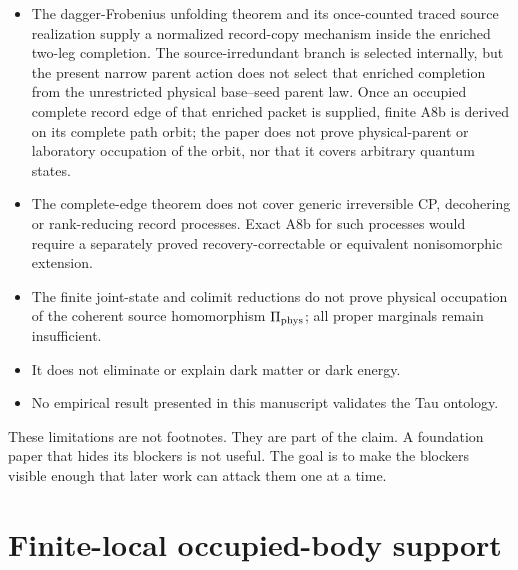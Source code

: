 \documentclass[11pt]{article}
\begin{document}
\begin{itemize}[leftmargin=*,itemsep=1pt,topsep=3pt]
  The support theorem and mixed-state realization prove that the common-Gram
  completion is mathematically nonempty, but the physical parent has not been
  shown to occupy the record instrument or select
  \(V_{\rm phys}=V_{r(x_O)}\).  No laboratory carrier has validated the
  same-source identity \(x_A=x_Q\).
  \item The dagger-Frobenius unfolding theorem and its once-counted traced
  source realization supply a normalized record-copy mechanism inside the
  enriched two-leg completion. The source-irredundant branch is selected
  internally, but the present narrow parent action does not select that
  enriched completion from the unrestricted physical base--seed parent law.
  Once an occupied complete record edge of that enriched packet is supplied,
  finite A8b is derived on its complete path orbit; the paper does not prove
  physical-parent or laboratory occupation of the orbit, nor that it covers
  arbitrary quantum states.
  \item The complete-edge theorem does not cover generic irreversible CP,
  decohering or rank-reducing record processes.  Exact A8b for such processes
  would require a separately proved recovery-correctable or equivalent
  nonisomorphic extension.
  \item The finite joint-state and colimit reductions do not prove physical
  occupation of the coherent source homomorphism \(\Pi_{\rm phys}\); all proper
  marginals remain insufficient.
  \item It does not eliminate or explain dark matter or dark energy.
  \item No empirical result presented in this manuscript validates the Tau
  ontology.
\end{itemize}

These limitations are not footnotes.  They are part of the claim.  A
foundation paper that hides its blockers is not useful.  The goal is to make
the blockers visible enough that later work can attack them one at a time.

\section{Finite-local occupied-body support}
\end{document}
